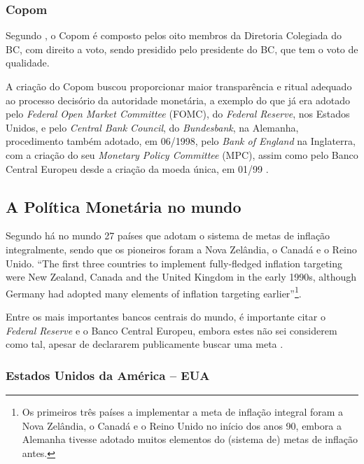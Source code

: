 \documentclass[
	10pt,				%
	openright,			%
	twoside,			%
	a5paper,			%
	english,			%
	french,				%
	spanish,			%
	brazil				%
	]{abntex2}
\renewenvironment{quote}
  {\small\list{}{\rightmargin=0.1cm \leftmargin=4cm}%
   \item\relax}
  {\endlist}
\begin{document}
\subsubsection{Copom}\label{copom}

Segundo , o Copom é composto pelos oito
membros da Diretoria Colegiada do BC, com direito a voto, sendo
presidido pelo presidente do BC, que tem o voto de qualidade.

\begin{quote}
A criação do Copom buscou proporcionar maior transparência e ritual
adequado ao processo decisório da autoridade monetária, a exemplo do que
já era adotado pelo \emph{Federal Open Market Committee} (FOMC), do
\emph{Federal Reserve}, nos Estados Unidos, e pelo \emph{Central Bank
Council}, do \emph{Bundesbank}, na Alemanha, procedimento também
adotado, em 06/1998, pelo \emph{Bank of England} na Inglaterra, com a
criação do seu \emph{Monetary Policy Committee} (MPC), assim como pelo
Banco Central Europeu desde a criação da moeda única, em 01/99
\cite[p.~61]{fortuna2015}.
\end{quote}

\subsection{A Política Monetária no mundo}\label{subsec:pol_mon_mun}

Segundo  há no mundo 27 países que adotam
o sistema de metas de inflação integralmente, sendo que os pioneiros
foram a Nova Zelândia, o Canadá e o Reino Unido. ``The first three
countries to implement fully-fledged inflation targeting were New
Zealand, Canada and the United Kingdom in the early 1990s, although
Germany had adopted many elements of inflation targeting
earlier''\footnote{Os primeiros três países a implementar a meta de
  inflação integral foram a Nova Zelândia, o Canadá e o Reino Unido no
  início dos anos 90, embora a Alemanha tivesse adotado muitos elementos
  do (sistema de) metas de inflação antes.}.

Entre os mais importantes bancos centrais do mundo, é importante citar o
\emph{Federal Reserve} e o Banco Central Europeu, embora estes não sei
considerem como tal, apesar de declararem publicamente buscar uma meta
\cite{inflationtargeting}.

\subsubsection{Estados Unidos da América --
EUA}\label{estados-unidos-da-amuxe9rica-eua}
\end{document}
